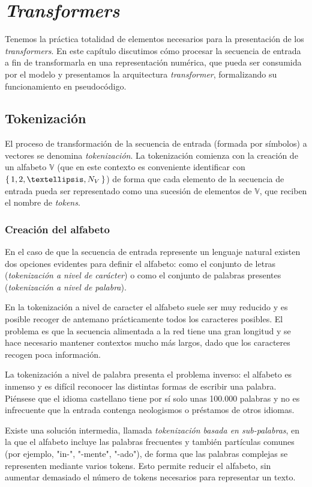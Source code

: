 \chapter{\textit{Transformers}}
Tenemos la práctica totalidad de elementos necesarios para la presentación de los \textit{transformers}. En este capítulo discutimos cómo procesar la secuencia de entrada a fin de transformarla en una representación numérica, que pueda ser consumida por el modelo y presentamos la arquitectura \textit{transformer}, formalizando su funcionamiento en pseudocódigo.

\section{Tokenización}
El proceso de transformación de la secuencia de entrada (formada por símbolos) a vectores se denomina \textit{tokenización}. La tokenización comienza con la creación de un alfabeto \( \mathbb{V} \) (que en este contexto es conveniente identificar con \( \Set{ 1, 2, …, N_V } \)) de forma que cada elemento de la secuencia de entrada pueda ser representado como una sucesión de elementos de \( \mathbb{V} \), que reciben el nombre de \textit{tokens}.

\subsection{Creación del alfabeto}
En el caso de que la secuencia de entrada represente un lenguaje natural existen dos opciones evidentes para definir el alfabeto: como el conjunto de letras (\textit{tokenización a nivel de carácter}) o como el conjunto de palabras presentes (\textit{tokenización a nivel de palabra}).

En la tokenización a nivel de caracter el alfabeto suele ser muy reducido y es posible recoger de antemano prácticamente todos los caracteres posibles. El problema es que la secuencia alimentada a la red tiene una gran longitud y se hace necesario mantener contextos mucho más largos, dado que los caracteres recogen poca información.

La tokenización a nivel de palabra presenta el problema inverso: el alfabeto es inmenso y es difícil reconocer las distintas formas de escribir una palabra. Piénsese que el idioma castellano tiene por sí solo unas 100.000 palabras y no es infrecuente que la entrada contenga neologismos o préstamos de otros idiomas.

Existe una solución intermedia, llamada \textit{tokenización basada en sub-palabras}, en la que el alfabeto incluye las palabras frecuentes y también partículas comunes (por ejemplo, "in-", "-mente", "-ado"), de forma que las palabras complejas se representen mediante varios tokens. Esto permite reducir el alfabeto, sin aumentar demasiado el número de tokens necesarios para representar un texto.

